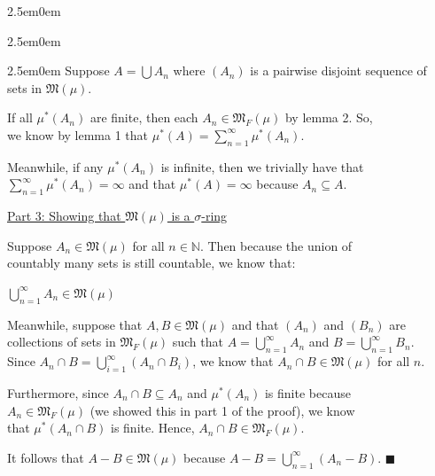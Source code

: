 \documentclass{book}
\newenvironment{myIndent}{%
   \begin{adjustwidth}{2.5em}{0em}%
}{%
   \end{adjustwidth}%
}
\newcommand{\retTwo}{\hfill\bigbreak}
\begin{document}
{\begin{myIndent}
{\begin{myIndent}
      {\begin{myIndent}\fontsize{12}{14}\selectfont
         Suppose $A = \bigcup A_n$ where $(A_n)$ is a pairwise disjoint sequence of\\ sets in $\mathfrak{M}(\mu)$.
         
         \newpage
         
         If all $\mu^*(A_n)$ are finite, then each $A_n \in \mathfrak{M}_F(\mu)$ by lemma 2. So,\\ we know by lemma 1 that $\mu^*(A) = \sum\limits_{n=1}^\infty \mu^*(A_n)$.\retTwo

         Meanwhile, if any $\mu^*(A_n)$ is infinite, then we trivially have that\\ $\sum\limits_{n=1}^\infty \mu^*(A_n) = \infty$ and that $\mu^*(A) = \infty$ because $A_n \subseteq A$.\\ [8pt]
      \end{myIndent}}

      {\centering \ul{Part 3: Showing that $\mathfrak{M}(\mu)$ is a $\sigma$-ring}\\[7pt]\par}

      Suppose $A_n \in \mathfrak{M}(\mu)$ for all $n \in \mathbb{N}$. Then because the union of\\ countably many sets is still countable, we know that:

      {\centering $\bigcup\limits_{n=1}^\infty A_n \in \mathfrak{M}(\mu)$ \retTwo\par}

      Meanwhile, suppose that $A, B \in \mathfrak{M}(\mu)$ and that $(A_n)$ and $(B_n)$ are\\ collections of sets in $\mathfrak{M}_F(\mu)$ such that $A = \bigcup\limits_{n=1}^\infty A_n$ and $B = \bigcup\limits_{n=1}^\infty B_n$.\\ [1pt]

      Since $A_n \cap B = \bigcup\limits_{i=1}^\infty (A_n \cap B_i)$, we  know that $A_n \cap B \in \mathfrak{M}(\mu)$ for all $n$.\retTwo
      
      Furthermore, since $A_n \cap B \subseteq A_n$ and $\mu^*(A_n)$ is finite because\\ $A_n \in \mathfrak{M}_F(\mu)$ (we showed this in part 1 of the proof), we know\\ that $\mu^*(A_n \cap B)$ is finite. Hence, $A_n \cap B \in \mathfrak{M}_F(\mu)$.\retTwo

      It follows that $A - B \in \mathfrak{M}(\mu)$ because $A - B = \bigcup\limits_{n=1}^\infty(A_n - B)$. $\blacksquare$\retTwo
   \end{myIndent}}
\end{myIndent}}
\end{document}

